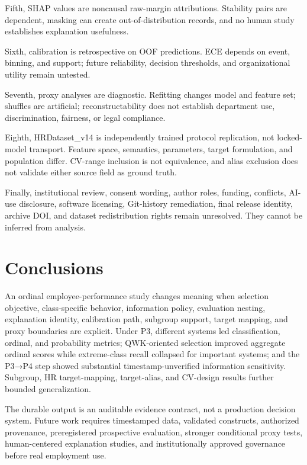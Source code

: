 \documentclass[information,article,submit,pdftex,moreauthors]{Definitions/mdpi}
\begin{document}
Fifth, SHAP values are noncausal raw-margin attributions. Stability pairs are dependent, masking can create out-of-distribution records, and no human study establishes explanation usefulness.

Sixth, calibration is retrospective on OOF predictions. ECE depends on event, binning, and support; future reliability, decision thresholds, and organizational utility remain untested.

Seventh, proxy analyses are diagnostic. Refitting changes model and feature set; shuffles are artificial; reconstructability does not establish department use, discrimination, fairness, or legal compliance.

Eighth, HRDataset\_v14 is independently trained protocol replication, not locked-model transport. Feature space, semantics, parameters, target formulation, and population differ. CV-range inclusion is not equivalence, and alias exclusion does not validate either source field as ground truth.

Finally, institutional review, consent wording, author roles, funding, conflicts, AI-use disclosure, software licensing, Git-history remediation, final release identity, archive DOI, and dataset redistribution rights remain unresolved. They cannot be inferred from analysis.

\section{Conclusions}

An ordinal employee-performance study changes meaning when selection objective, class-specific behavior, information policy, evaluation nesting, explanation identity, calibration path, subgroup support, target mapping, and proxy boundaries are explicit. Under P3, different systems led classification, ordinal, and probability metrics; QWK-oriented selection improved aggregate ordinal scores while extreme-class recall collapsed for important systems; and the P3→P4 step showed substantial timestamp-unverified information sensitivity. Subgroup, HR target-mapping, target-alias, and CV-design results further bounded generalization.

The durable output is an auditable evidence contract, not a production decision system. Future work requires timestamped data, validated constructs, authorized provenance, preregistered prospective evaluation, stronger conditional proxy tests, human-centered explanation studies, and institutionally approved governance before real employment use.
\end{document}
